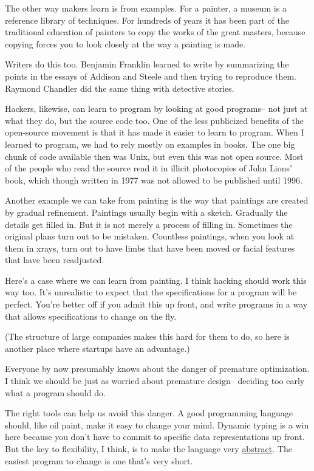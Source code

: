 The other way makers learn is from examples.
For a painter, a museum is a reference library of techniques.
For hundreds of years it has been part of the traditional
education of painters to copy the works of the great masters,
because copying forces you to look closely
at the way a painting is made.

Writers do this too.
Benjamin Franklin learned to write by summarizing the points   
in the essays of Addison and Steele and then trying to
reproduce them.  Raymond Chandler did the same thing
with detective stories.

Hackers, likewise, can learn to program by looking at 
good programs-- not just at what they do, but the source
code too.  One of the less publicized benefits
of the open-source movement is that it has made it easier
to learn to program.  When I learned to program, we had to rely
mostly on examples in books.  The one big chunk of
code available then was Unix, but even this was not   
open source.  Most of the people who read the source
read it in illicit photocopies of John Lions' book, which
though written in 1977 was not allowed to be published
until 1996.



Another example we can take from painting is the way that
paintings are created by gradual refinement.  Paintings usually
begin with a sketch.
Gradually the details get filled in.
But it is not merely a process of filling in. Sometimes   
the original plans turn out to be mistaken.
Countless paintings,
when you look at them in xrays, turn out to have limbs that
have been moved or facial features that have been readjusted.

Here's a case where we can learn from painting.  I think hacking
should work this way too.  It's unrealistic
to expect that the specifications for a program will be
perfect. You're
better off if you admit this up front, and write programs in
a way that allows specifications to change on the fly.

(The structure of large companies makes this hard for them
to do, so here is another place where startups have an advantage.)

Everyone by now presumably knows about the danger of premature
optimization.  I think we should be just as worried about
premature design-- deciding too early what
a program should do.

The right tools can help us avoid
this danger.
A good programming language should, like oil paint, make it
easy to change your mind.  Dynamic typing is a win here because
you don't have to
commit to specific data representations up front.
But the key to flexibility, I think, is to make the language
very \href{http://www.paulgraham.com/power.html}{abstract}.
The easiest program to change is one that's very short.




